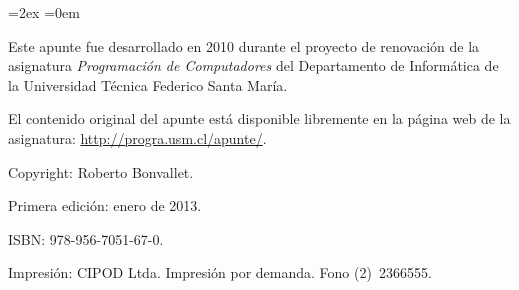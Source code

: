 \thispagestyle{empty}
\begin{minipage}[B]{\textwidth}
  \footnotesize
  \parskip=2ex
  \parindent=0em

  Este apunte fue desarrollado en 2010
  durante el proyecto de renovación de la asignatura
  \emph{Programación de Computadores}
  del Departamento de Informática
  de la Universidad Técnica Federico Santa María.

  El contenido original del apunte está disponible libremente
  en la página web de la asignatura:
  \url{http://progra.usm.cl/apunte/}.

  Copyright:  Roberto Bonvallet.

  Primera edición: enero de 2013.

  ISBN: 978-956-7051-67-0.

  Impresión: CIPOD Ltda. Impresión por demanda. Fono (2)~2366555.
\end{minipage}


